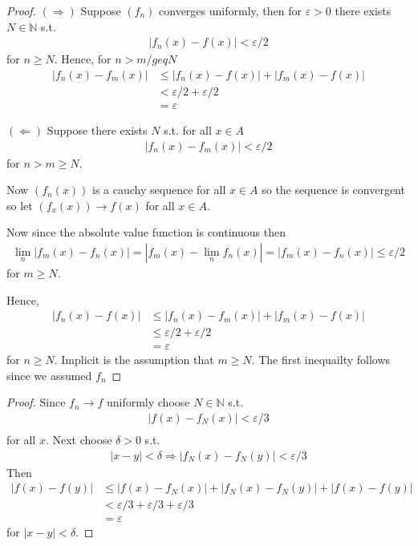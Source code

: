 \begin{proof}
    $(\Rightarrow)$ Suppose $(f_n)$ converges uniformly, then 
    for $\varepsilon>0$ there
    exists $N\in \mathbb{N}$ s.t. 
    \begin{align*}
        |f_n(x)-f(x)| < \varepsilon/2
    \end{align*}
    for $n\geq N$. Hence, for $n>m/geq N$
    \begin{align*}
        |f_n(x)-f_m(x)| &\leq |f_n(x) - f(x)| + |f_m(x) - f(x)| \\
                        &< \varepsilon/2 + \varepsilon/2 \\
                        &= \varepsilon 
    \end{align*}

    $(\Leftarrow)$ Suppose there exists $N$ s.t. for all $x\in A$
    \begin{align*}
        |f_n(x)-f_m(x)| < \varepsilon/2
    \end{align*} 
    for $n>m\geq N$.

    Now $(f_n(x))$ is a cauchy sequence for all $x\in A$ so the sequence is 
    convergent so let $(f_x(x))\rightarrow f(x)$ for all $x\in A$.

    Now since the absolute value function is continuous then 
    \begin{align*}
        \lim_n |f_m(x)-f_n(x)| = |f_m(x)-\lim_n f_n(x)| = |f_m(x)-f_n(x)| \leq \varepsilon/2
    \end{align*}
    for $m\geq N$.

    Hence,
    \begin{align*}
        |f_n(x) - f(x)| & \leq |f_n(x)-f_m(x)| + |f_m(x)-f(x)| \\
                        &\leq \varepsilon/2 + \varepsilon/2 \\
                        &= \varepsilon
    \end{align*}
    for $n\geq N$. Implicit is the assumption that 
    $m\geq N$. The first inequailty follows since we assumed $f_n$
\end{proof}

\begin{proof}
    Since $f_n \rightarrow f$ uniformly choose $N \in \mathbb{N}$
    s.t. 
    \begin{gather*}
        |f(x)-f_N(x)| < \varepsilon/3 \\
    \end{gather*}
    for all $x$.
    Next choose $\delta>0$ s.t. 
    \begin{align*}
        |x-y|< \delta \Rightarrow |f_N(x)-f_N(y)|<\varepsilon/3
    \end{align*}
    Then 
    \begin{align*}
        |f(x)-f(y)| &\leq |f(x)-f_N(x)| + |f_N(x)-f_N(y)| + |f(x)-f(y)| \\
        &< \varepsilon/3 + \varepsilon/3 + \varepsilon/3 \\
        &= \varepsilon
    \end{align*}
    for $|x-y|< \delta$.
\end{proof}

